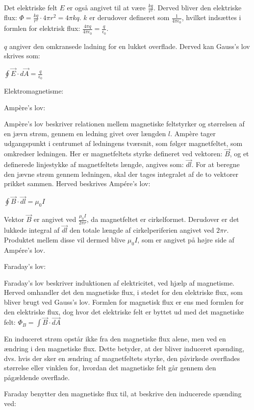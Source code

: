 Det elektriske felt $E$ er også angivet til at være $\frac{kq}{r^2}$. Derved bliver den elektriske flux: $\Phi = \frac{kq}{r^2} \cdot 4 \pi r^2 = 4 \pi k q$. $k$ er derudover defineret som $\frac{1}{4 \pi \epsilon_0}$, hvilket indsættes i formlen for elektrisk flux: $\frac{4 \pi q}{4 \pi \epsilon_0} = \frac{q}{\epsilon_0}$.

$q$ angiver den omkransede ladning for en lukket overflade. Derved kan Gauss's lov skrives som:

\centerline{$\oint \vec{E} \cdot d \vec{A} = \frac{q}{\epsilon_0}$}

Elektromagnetisme:

Ampère's lov:

Ampère's lov beskriver relationen mellem magnetiske feltstyrker og størrelsen af en jævn strøm, gennem en ledning givet over længden $l$. Ampère tager udgangspunkt i centrumet af ledningens tværsnit, som følger magnetfeltet, som omkredser ledningen. Her er magnetfeltets styrke defineret ved vektoren: $\vec{B}$, og et definerede linjestykke af magnetfeltets længde, angives som: $\vec{dl}$. For at beregne den jævne strøm gennem ledningen, skal der tages integralet af de to vektorer prikket sammen. Herved beskrives Ampére's lov:

\centerline{$\oint \vec{B} \cdot \vec{dl} = \mu_0 I$}

Vektor $\vec{B}$ er angivet ved $\frac{\mu_0 I}{2 \pi r}$, da magnetfeltet er cirkelformet. Derudover er det lukkede integral af $\vec{dl}$ den totale længde af cirkelperiferien angivet ved $2 \pi r$. Produktet mellem disse vil dermed blive $\mu_0 I$, som er angivet på højre side af Ampére's lov.

Faraday's lov:

Faraday's lov beskriver induktionen af elektricitet, ved hjælp af magnetisme. Herved omhandler det den magnetiske flux, i stedet for den elektriske flux, som bliver brugt ved Gauss's lov. Formlen for magnetisk flux er ens med formlen for den elektriske flux, dog hvor det elektriske felt er byttet ud med det magnetiske felt: $\Phi_B = \int \vec{B} \cdot \vec{dA}$

En induceret strøm opstår ikke fra den magnetiske flux alene, men ved en ændring i den magnetiske flux. Dette betyder, at der bliver induceret spænding, dvs. hvis der sker en ændring af magnetfeltets styrke, den påvirkede overflades størrelse eller vinklen for, hvordan det magnetiske felt går gennem den pågældende overflade.

Faraday benytter den magnetiske flux til, at beskrive den inducerede spænding ved:

